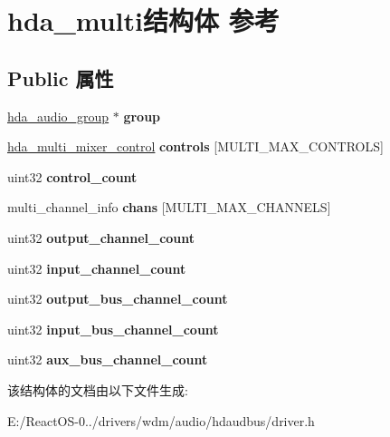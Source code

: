 \hypertarget{structhda__multi}{}\section{hda\+\_\+multi结构体 参考}
\label{structhda__multi}
\subsection*{Public 属性}
\begin{DoxyCompactItemize}
\item 
\mbox{\label{structhda__multi_a64710f99ffdd8ae6229dd4c7afadef50}} 
\hyperlink{structhda__audio__group}{hda\+\_\+audio\+\_\+group} $\ast$ {\bfseries group}
\item 
\mbox{\label{structhda__multi_a5954d1bf815d1f899a50b5d4f5e75c4e}} 
\hyperlink{structhda__multi__mixer__control}{hda\+\_\+multi\+\_\+mixer\+\_\+control} {\bfseries controls} \mbox{[}M\+U\+L\+T\+I\+\_\+\+M\+A\+X\+\_\+\+C\+O\+N\+T\+R\+O\+LS\mbox{]}
\item 
\mbox{\label{structhda__multi_af166fef304c3311f01da090401b7bee7}} 
uint32 {\bfseries control\+\_\+count}
\item 
\mbox{\label{structhda__multi_a0819c1ba97e2cc9b1328b6d05ed4f2ef}} 
multi\+\_\+channel\+\_\+info {\bfseries chans} \mbox{[}M\+U\+L\+T\+I\+\_\+\+M\+A\+X\+\_\+\+C\+H\+A\+N\+N\+E\+LS\mbox{]}
\item 
\mbox{\label{structhda__multi_a814a1b7b5a15ce828e7bb536fa66a748}} 
uint32 {\bfseries output\+\_\+channel\+\_\+count}
\item 
\mbox{\label{structhda__multi_acc9fda1ebdf9aed80c389f5bbce6a7f8}} 
uint32 {\bfseries input\+\_\+channel\+\_\+count}
\item 
\mbox{\label{structhda__multi_a8f44a65f02c5bafe7242be1bb3afec40}} 
uint32 {\bfseries output\+\_\+bus\+\_\+channel\+\_\+count}
\item 
\mbox{\label{structhda__multi_a6b740ddb82c0fff8db685074fdd8e516}} 
uint32 {\bfseries input\+\_\+bus\+\_\+channel\+\_\+count}
\item 
\mbox{\label{structhda__multi_a2390a243ed652b51e76669703ce91992}} 
uint32 {\bfseries aux\+\_\+bus\+\_\+channel\+\_\+count}
\end{DoxyCompactItemize}


该结构体的文档由以下文件生成\+:\begin{DoxyCompactItemize}
\item 
E\+:/\+React\+O\+S-\/0../drivers/wdm/audio/hdaudbus/driver.\+h\end{DoxyCompactItemize}
